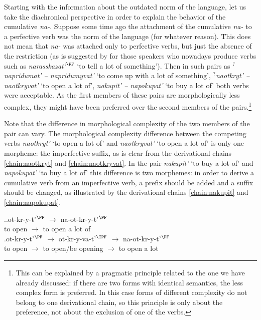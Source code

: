 Starting with the information about the outdated norm of the language, let us take the diachronical perspective in order to explain the behavior of the cumulative \textit{na-}. Suppose some time ago the attachment of the cumulative \textit{na-} to a perfective verb was the norm of the language (for whatever reason). This does not mean that \textit{na-} was attached only to perfective verbs, but just the absence of the restriction (as is suggested by \citet{Tatevosov:13a} for those speakers who nowadays produce verbs such as \textit{narasskazat'}$^{\PF}$ `to tell a lot of something'). Then in such pairs as \textit{$^?$napridumat' -- napridumyvat'} `to come up with a lot of something', \textit{$^?$naotkryt' -- naotkryvat'} `to open a lot of', \textit{nakupit' -- napokupat'} `to buy a lot of' both verbs were acceptable. As the first members of these pairs are morphologically less complex, they might have been preferred over the second members of the pairs.\footnote{This can be explained by a pragmatic principle related to the one we have already discussed: if there are two forms with identical semantics, the less complex form is preferred. In this case forms of different complexity do not belong to one derivational chain, so this principle is only about the preference, not about the exclusion of one of the verbs.} 

Note that the difference in morphological complexity of the two members of the pair can vary. The morphological complexity difference between the competing verbs \textit{naotkryt'} `to open a lot of' and \textit{naotkryvat'} `to open a lot of' is only one morpheme: the imperfective suffix, as is clear from the derivational chains \ref{chain:naotkryt} and \ref{chain:naotkryvat}. In the pair  \textit{nakupit'} `to buy a lot of' and  \textit{napokupat'} `to buy a lot of' this difference is two morphemes: in order to derive a cumulative verb from an imperfective verb, a prefix should be added and a suffix should be changed, as illustrated by the derivational chains \ref{chain:nakupit} and \ref{chain:napokupat}.

\ex.\ag.\label{chain:naotkryt}ot-kr-y-t'$^{\PF}$ $\rightarrow$ na-ot-kr-y-t'$^{\PF}$\\
{to open} $\rightarrow$ {to open a lot of}\\
\bg.\label{chain:naotkryvat}ot-kr-y-t'$^{\PF}$ $\rightarrow$ ot-kr-y-va-t'$^{\IPF}$ $\rightarrow$ na-ot-kr-y-t'$^{\PF}$\\
{to open} $\rightarrow$ {to open/be opening} $\rightarrow$ {to open a lot}\\

